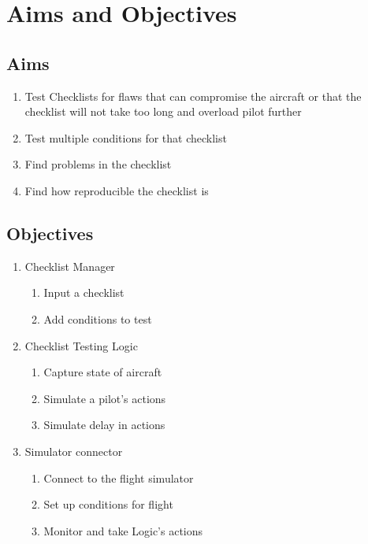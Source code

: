 \documentclass[a4paper]{article}
\newcommand{\lfcomment}[1]{\textcolor{blue}{\textbf{LF}:~#1}}
\renewcommand{\lfcomment}[1]{\relax}
\begin{document}
\section{Aims and Objectives}
\subsection*{Aims}
\begin{enumerate}
    \item Test Checklists for flaws that can compromise the
      aircraft or that the checklist will not take too long
      and overload pilot further
    \item Test multiple conditions for that checklist
    \item Find problems in the checklist
    \item Find how reproducible the checklist is
\end{enumerate}

\lfcomment{See above about "testing" what?}

\subsection*{Objectives}
\begin{enumerate}
    \item Checklist Manager
    \begin{enumerate}
        \item Input a checklist
        \item Add conditions to test        
    \end{enumerate}
    \item Checklist Testing Logic
    \begin{enumerate}
        \item Capture state of aircraft
        \item Simulate a pilot's actions
        \item Simulate delay in actions
        \lfcomment{\item Ensure consistency of checklist logic}
    \end{enumerate}
    \item Simulator connector
    \begin{enumerate}
        \item Connect to the flight simulator
        \item Set up conditions for flight
        \item Monitor and take Logic's actions
    \end{enumerate}
\end{enumerate}
\end{document}
